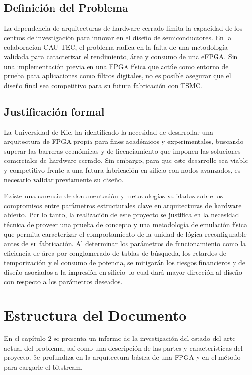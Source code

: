 \subsection{Definición del Problema}

La dependencia de arquitecturas de hardware cerrado limita la capacidad de los centros
de investigación para innovar en el diseño de semiconductores. En la colaboración CAU
TEC, el problema radica en la falta de una metodología validada para caracterizar el
rendimiento, área y consumo de una eFPGA. Sin una implementación previa en una
FPGA física que actúe como entorno de prueba para aplicaciones como filtros digitales,
no es posible asegurar que el diseño final sea competitivo para su futura fabricación con
TSMC.

\subsection{Justificación formal}

La Universidad de Kiel ha identificado la necesidad de desarrollar una arquitectura 
de FPGA propia para fines académicos y experimentales, buscando superar las barreras 
económicas y de licenciamiento que imponen las soluciones comerciales de hardware cerrado. 
Sin embargo, para que este desarrollo sea viable y competitivo frente a una futura 
fabricación en silicio con nodos avanzados, es necesario validar previamente su diseño.

Existe una carencia de documentación y metodologías validadas sobre 
los compromisos entre parámetros estructurales clave en arquitecturas de hardware abierto. 
Por lo tanto, la realización de este proyecto se justifica en la necesidad técnica de proveer 
una prueba de concepto y una metodología de emulación física que permita caracterizar el 
comportamiento de la unidad de lógica reconfigurable antes de su fabricación. Al determinar 
los parámetros de funcionamiento como la eficiencia de área por conglomerado de tablas de 
búsqueda, los retardos de temporización y el consumo de potencia, se mitigarán los riesgos 
financieros y de diseño asociados a la impresión en silicio, lo cual dará mayor dirección al diseño 
con respecto a los parámetros deseados.

\section{Estructura del Documento}

En el capítulo 2 se presenta un informe de la investigación del 
estado del arte actual del problema, así como una descripción de las partes y 
características del proyecto. Se profundiza en la arquitectura básica de una FPGA 
y en el método para cargarle el bitstream.


